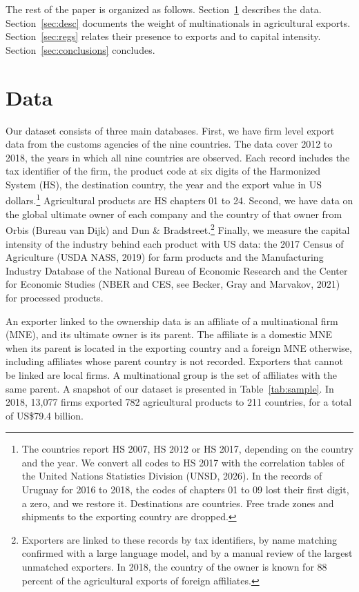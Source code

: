\documentclass[article, 12pt, 3p]{elsarticle}
\numberwithin{corollary}{proposition}
\begin{document}
The rest of the paper is organized as follows. Section~\ref{sec:data} describes the data. Section~\ref{sec:desc}
documents the weight of multinationals in agricultural exports. Section~\ref{sec:regs} relates their presence to
exports and to capital intensity. Section~\ref{sec:conclusions} concludes.

\section{Data}\label{sec:data}

Our dataset consists of three main databases. First, we have firm level export data from the customs agencies of the
nine countries. The data cover 2012 to 2018, the years in which all nine countries are observed. Each record includes
the tax identifier of the firm, the product code at six digits of the Harmonized System (HS), the destination country,
the year and the export value in US dollars.\footnote{The countries report HS 2007, HS 2012 or HS 2017, depending on the
country and the year. We convert all codes to HS 2017 with the correlation tables of the United Nations Statistics
Division (UNSD, 2026). In the records of Uruguay for 2016 to 2018, the codes of chapters 01 to 09 lost their first digit,
a zero, and we restore it. Destinations are countries. Free trade zones and shipments to the exporting country are
dropped.} Agricultural products are HS chapters 01 to 24. Second, we have data on the global ultimate owner of each
company and the country of that owner from Orbis (Bureau van Dijk) and Dun \& Bradstreet.\footnote{Exporters are linked
to these records by tax identifiers, by name matching confirmed with a large language model, and by a manual review of
the largest unmatched exporters. In 2018, the country of the owner is known for 88 percent of the agricultural exports
of foreign affiliates.} Finally, we measure the capital intensity of the industry behind each product with US data: the
2017 Census of Agriculture (USDA NASS, 2019) for farm products and the Manufacturing Industry Database of the National
Bureau of Economic Research and the Center for Economic Studies (NBER and CES, see Becker, Gray and Marvakov, 2021) for
processed products.

An exporter linked to the ownership data is an affiliate of a multinational firm (MNE), and its ultimate owner is its
parent. The affiliate is a domestic MNE when its parent is located in the exporting country and a foreign MNE
otherwise, including affiliates whose parent country is not recorded. Exporters that cannot be linked are local firms.
A multinational group is the set of affiliates with the same parent. A snapshot of our dataset is presented in
Table~\ref{tab:sample}. In 2018, 13,077 firms exported 782 agricultural products to 211 countries, for a total of
US\$79.4 billion.
\end{document}
